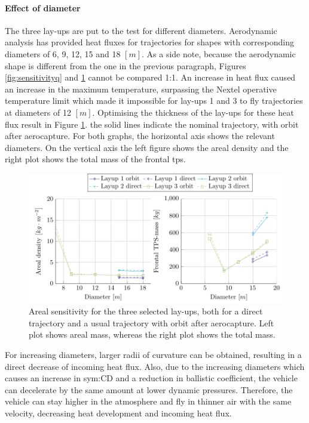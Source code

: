 \paragraph{Effect of diameter}
The three lay-ups are put to the test for different diameters. Aerodynamic analysis has provided heat fluxes for trajectories for shapes with corresponding diameters of 6, 9, 12, 15 and 18 $\left[ m \right]$. As a side note, because the aerodynamic shape is different from the one in the previous paragraph, Figures \ref{fig:sensitivityq} and \ref{fig:sensitivityA} cannot be compared 1:1. An increase in heat flux caused an increase in the maximum temperature, surpassing the Nextel operative temperature limit which made it impossible for lay-ups 1 and 3 to fly trajectories at diameters of 12 $\left[ m \right]$. Optimising the thickness of the lay-ups for these heat flux result in Figure \ref{fig:sensitivityA}. the solid lines indicate the nominal trajectory, with orbit after aerocapture. For both graphs, the horizontal axis shows the relevant diameters. On the vertical axis the left figure shows the areal density and the right plot shows the total mass of the frontal \gls{tps}. 

\begin{figure}[h]
	\centering
	\includegraphics{./Figure/Thermal/SensitivityA.pdf}
	\caption[Areal sensitivity for the three selected lay-ups]{Areal sensitivity for the three selected lay-ups, both for a direct trajectory and a usual trajectory with orbit after aerocapture. Left plot shows areal mass, whereas the right plot shows the total mass.}
	\label{fig:sensitivityA}
\end{figure}

For increasing diameters, larger radii of curvature can be obtained, resulting in a direct decrease of incoming heat flux. Also, due to the increasing diameters which causes an increase in \gls{sym:CD} and a reduction in ballistic coefficient, the vehicle can decelerate by the same amount at lower dynamic pressures. Therefore, the vehicle can stay higher in the atmosphere and fly in thinner air with the same velocity, decreasing heat development and incoming heat flux.\\

